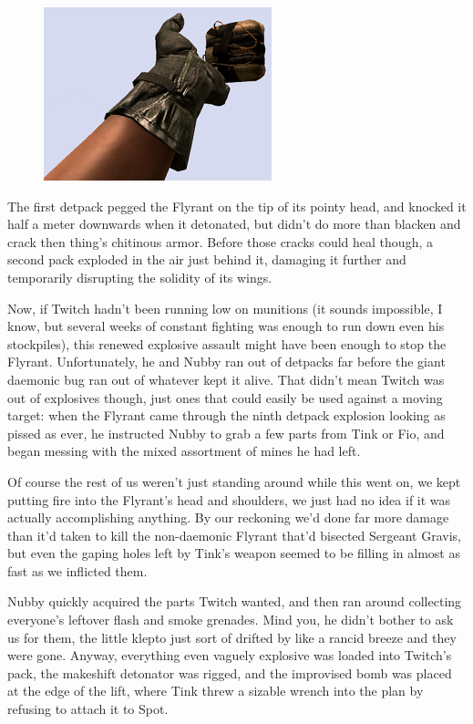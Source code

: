 \begin{figure}
	\begin{center}
		\includegraphics[width=\figwidth]{pics/15/68.png}
	\end{center}
\end{figure}
The first detpack pegged the Flyrant on the tip of its pointy head, and knocked it half a meter downwards when it detonated, but didn't do more than blacken and crack then thing's chitinous armor. 
Before those cracks could heal though, a second pack exploded in the air just behind it, damaging it further and temporarily disrupting the solidity of its wings.

Now, if Twitch hadn't been running low on munitions (it sounds impossible, I know, but several weeks of constant fighting was enough to run down even his stockpiles), this renewed explosive assault might have been enough to stop the Flyrant. 
Unfortunately, he and Nubby ran out of detpacks far before the giant daemonic bug ran out of whatever kept it alive. 
That didn't mean Twitch was out of explosives though, just ones that could easily be used against a moving target: 
when the Flyrant came through the ninth detpack explosion looking as pissed as ever, he instructed Nubby to grab a few parts from Tink or Fio, and began messing with the mixed assortment of mines he had left.

Of course the rest of us weren't just standing around while this went on, we kept putting fire into the Flyrant's head and shoulders, we just had no idea if it was actually accomplishing anything. 
By our reckoning we'd done far more damage than it'd taken to kill the non-daemonic Flyrant that'd bisected Sergeant Gravis, but even the gaping holes left by Tink's weapon seemed to be filling in almost as fast as we inflicted them.

Nubby quickly acquired the parts Twitch wanted, and then ran around collecting everyone's leftover flash and smoke grenades. 
Mind you, he didn't bother to ask us for them, the little klepto just sort of drifted by like a rancid breeze and they were gone. 
Anyway, everything even vaguely explosive was loaded into Twitch's pack, the makeshift detonator was rigged, and the improvised bomb was placed at the edge of the lift, where Tink threw a sizable wrench into the plan by refusing to attach it to Spot.

